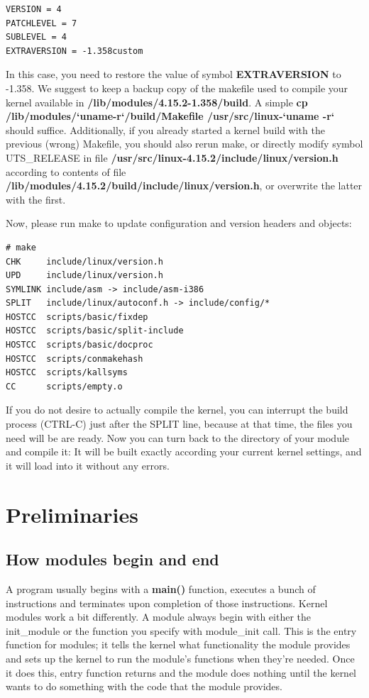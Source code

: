\documentclass[11pt]{article}
\begin{document}
\begin{verbatim}
VERSION = 4
PATCHLEVEL = 7
SUBLEVEL = 4
EXTRAVERSION = -1.358custom
\end{verbatim}

In this case, you need to restore the value of symbol \textbf{EXTRAVERSION} to -1.358. We suggest to keep a backup copy of the makefile used to compile your kernel available in \textbf{/lib/modules/4.15.2-1.358/build}. A simple \textbf{cp /lib/modules/`uname-r`/build/Makefile /usr/src/linux-`uname -r`} should suffice. Additionally, if you already started a kernel build with the previous (wrong) Makefile, you should also rerun make, or directly modify symbol UTS\_RELEASE in file \textbf{/usr/src/linux-4.15.2/include/linux/version.h} according to contents of file \textbf{/lib/modules/4.15.2/build/include/linux/version.h}, or overwrite the latter with the first.

Now, please run make to update configuration and version headers and objects:

\begin{verbatim}
# make
CHK     include/linux/version.h
UPD     include/linux/version.h
SYMLINK include/asm -> include/asm-i386
SPLIT   include/linux/autoconf.h -> include/config/*
HOSTCC  scripts/basic/fixdep
HOSTCC  scripts/basic/split-include
HOSTCC  scripts/basic/docproc
HOSTCC  scripts/conmakehash
HOSTCC  scripts/kallsyms
CC      scripts/empty.o
\end{verbatim}

If you do not desire to actually compile the kernel, you can interrupt the build process (CTRL-C) just after the SPLIT line, because at that time, the files you need will be are ready. Now you can turn back to the directory of your module and compile it: It will be built exactly according your current kernel settings, and it will load into it without any errors.

\section*{Preliminaries}
\label{sec-5}
\subsection*{How modules begin and end}
\label{sec-5-1}
A program usually begins with a \textbf{main()} function, executes a bunch of instructions and terminates upon completion of those instructions. Kernel modules work a bit differently. A module always begin with either the init\_module or the function you specify with module\_init call. This is the entry function for modules; it tells the kernel what functionality the module provides and sets up the kernel to run the module's functions when they're needed. Once it does this, entry function returns and the module does nothing until the kernel wants to do something with the code that the module provides.
\end{document}
